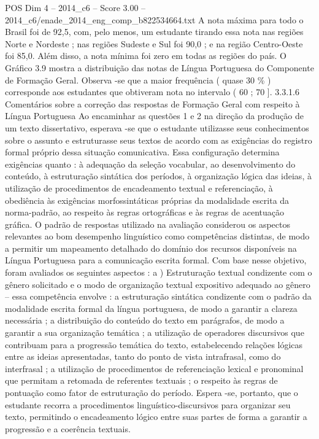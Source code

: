 \begin{textsample}{POS Dim 4 – 2014\_c6 – Score 3.00 – 2014\_c6/enade\_2014\_eng\_comp\_b822534664.txt}
A nota máxima para todo o Brasil foi de 92,5, com, pelo menos, um estudante tirando essa nota nas regiões Norte e Nordeste ; nas regiões Sudeste e Sul foi 90,0 ; e na região Centro-Oeste foi 85,0.
Além disso, a nota mínima foi zero em todas as regiões do país.
O Gráfico 3.9 mostra a distribuição das notas de Língua Portuguesa do Componente de Formação Geral.
Observa -se que a maior frequência ( quase 30 \% ) corresponde aos estudantes que obtiveram nota no intervalo ( 60 ; 70 ]. 3.3.1.6 Comentários sobre a correção das respostas de Formação Geral com respeito à Língua Portuguesa Ao encaminhar as questões 1 e 2 na direção da produção de um texto dissertativo, esperava -se que o estudante utilizasse seus conhecimentos sobre o assunto e estruturasse seus textos de acordo com as exigências do registro formal próprio dessa situação comunicativa.
Essa configuração determina exigências quanto : à adequação da seleção vocabular, ao desenvolvimento do conteúdo, à estruturação sintática dos períodos, à organização lógica das ideias, à utilização de procedimentos de encadeamento textual e referenciação, à obediência às exigências morfossintáticas próprias da modalidade escrita da norma-padrão, ao respeito às regras ortográficas e às regras de acentuação gráfica.
O padrão de respostas utilizado na avaliação considerou os aspectos relevantes ao bom desempenho linguístico como competências distintas, de modo a permitir um mapeamento detalhado do domínio dos recursos disponíveis na Língua Portuguesa para a comunicação escrita formal.
Com base nesse objetivo, foram avaliados os seguintes aspectos : a ) Estruturação textual condizente com o gênero solicitado e o modo de organização textual expositivo adequado ao gênero – essa competência envolve : a estruturação sintática condizente com o padrão da modalidade escrita formal da língua portuguesa, de modo a garantir a clareza necessária ; a distribuição do conteúdo do texto em parágrafos, de modo a garantir a sua organização temática ; a utilização de operadores discursivos que contribuam para a progressão temática do texto, estabelecendo relações lógicas entre as ideias apresentadas, tanto do ponto de vista intrafrasal, como do interfrasal ; a utilização de procedimentos de referenciação lexical e pronominal que permitam a retomada de referentes textuais ; o respeito às regras de pontuação como fator de estruturação do período.
Espera -se, portanto, que o estudante recorra a procedimentos linguístico-discursivos para organizar seu texto, permitindo o encadeamento lógico entre suas partes de forma a garantir a progressão e a coerência textuais.

\end{textsample}
